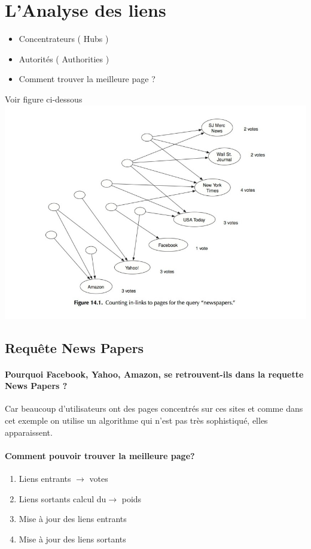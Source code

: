 \section{L’Analyse des liens}
\begin{itemize}
\item Concentrateurs ( Hubs )
\item Autorités ( Authorities )
\item Comment trouver la meilleure page ?
\end{itemize}

Voir figure ci-dessous \\	

\includegraphics[scale=0.5]{images/ref/fig-14-1.jpeg}
\subsection{Requête News Papers}

\paragraph{Pourquoi Facebook, Yahoo, Amazon, se retrouvent-ils dans la requette News Papers ?}
Car beaucoup d'utilisateurs ont des pages concentrés sur ces sites et comme dans cet exemple on utilise un algorithme qui n'est pas très sophistiqué, elles apparaissent. 

\paragraph{Comment pouvoir trouver la meilleure page?}
\begin{enumerate}
\item Liens entrants $ \rightarrow $ votes
\item Liens sortants  calcul du$ \rightarrow$  poids
\item Mise à jour des liens entrants
\item Mise à jour des liens sortants 
\end{enumerate}

